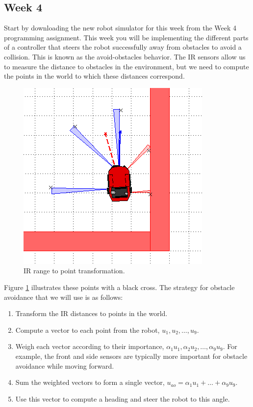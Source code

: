 \documentclass[10pt]{article}
\begin{document}
\newpage
\subsection{Week 4}

Start by downloading the new robot simulator for this week from the Week 4 programming assignment. This week you will be implementing the different parts of a controller that steers the robot successfully away from obstacles to avoid a collision. This is known as the avoid-obstacles behavior. The IR sensors allow us to measure the distance to obstacles in the environment, but we need to compute the points in the world to which these distances correspond.
\begin{figure}[h]
 \centering
 \includegraphics[scale=0.5]{images/week-4-ir-points.png}
 \caption{IR range to point transformation.}
  \label{fig:week4irpoints}
\end{figure}
Figure \ref{fig:week4irpoints} illustrates these points with a black cross. The strategy for obstacle avoidance that we will use is as follows:

\begin{enumerate}
  \item Transform the IR distances to points in the world.
  \item Compute a vector to each point from the robot, $u_1,u_2,\ldots,u_9$.
  \item Weigh each vector according to their importance, $\alpha_1u_1,\alpha_2u_2,\ldots,\alpha_9u_9$. For example, the front and side sensors are typically more important for obstacle avoidance while moving forward.
  \item Sum the weighted vectors to form a single vector, $u_{ao}=\alpha_1u_1+\ldots+\alpha_9u_9$.
  \item Use this vector to compute a heading and steer the robot to this angle.
\end{enumerate}
\end{document}
